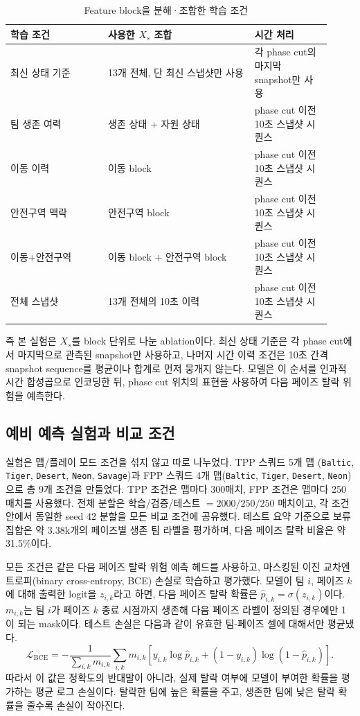\begin{table}[t]
\centering
\caption{Feature block을 분해·조합한 학습 조건}
\label{tab:feature-condition-map}
\small
\setlength{\tabcolsep}{4pt}
\begin{tabular}{L{0.28\linewidth}L{0.42\linewidth}L{0.22\linewidth}}
\toprule
학습 조건 & 사용한 \(X_s\) 조합 & 시간 처리 \\
\midrule
최신 상태 기준
& 13개 전체, 단 최신 스냅샷만 사용
& 각 phase cut의 마지막 snapshot만 사용 \\
팀 생존 여력
& 생존 상태 + 자원 상태
& phase cut 이전 10초 스냅샷 시퀀스 \\
이동 이력
& 이동 block
& phase cut 이전 10초 스냅샷 시퀀스 \\
안전구역 맥락
& 안전구역 block
& phase cut 이전 10초 스냅샷 시퀀스 \\
이동+안전구역
& 이동 block + 안전구역 block
& phase cut 이전 10초 스냅샷 시퀀스 \\
전체 스냅샷
& 13개 전체의 10초 이력
& phase cut 이전 10초 스냅샷 시퀀스 \\
\bottomrule
\end{tabular}
\end{table}

즉 본 실험은 \(X_s\)를 block 단위로 나눈 ablation이다. 최신 상태 기준은 각 phase
cut에서 마지막으로 관측된 snapshot만 사용하고, 나머지 시간 이력 조건은 10초 간격
snapshot sequence를 평균이나 합계로 먼저 뭉개지 않는다. 모델은 이 순서를 인과적
시간 합성곱으로 인코딩한 뒤, phase cut 위치의 표현을 사용하여 다음 페이즈 탈락
위험을 예측한다.

\subsection{예비 예측 실험과 비교 조건}

실험은 맵/플레이 모드 조건을 섞지 않고 따로 나누었다. TPP 스쿼드 5개 맵
(\texttt{Baltic}, \texttt{Tiger}, \texttt{Desert}, \texttt{Neon}, \texttt{Savage})과
FPP 스쿼드 4개 맵(\texttt{Baltic}, \texttt{Tiger}, \texttt{Desert}, \texttt{Neon})으로
총 9개 조건을 만들었다. TPP 조건은 맵마다 300매치, FPP 조건은 맵마다 250매치를
사용했다. 전체 분할은 학습/검증/테스트 \(=2000/250/250\) 매치이고, 각 조건 안에서
동일한 seed 42 분할을 모든 비교 조건에 공유했다. 테스트 요약
기준으로 보류 집합은 약 3.38k개의 페이즈별 생존 팀 라벨을 평가하며, 다음 페이즈
탈락 비율은 약 31.5\%이다.

모든 조건은 같은 다음 페이즈 탈락 위험 예측 헤드를 사용하고, 마스킹된 이진
교차엔트로피(binary cross-entropy, BCE) 손실로 학습하고 평가했다. 모델이 팀
\(i\), 페이즈 \(k\)에 대해 출력한 logit을 \(z_{i,k}\)라고 하면, 다음 페이즈 탈락
확률은 \(\hat{p}_{i,k}=\sigma(z_{i,k})\)이다. \(m_{i,k}\)는 팀 \(i\)가 페이즈 \(k\)
종료 시점까지 생존해 다음 페이즈 라벨이 정의된 경우에만 1이 되는 mask이다. 테스트
손실은 다음과 같이 유효한 팀-페이즈 셀에 대해서만 평균냈다.
\[
\mathcal{L}_{\mathrm{BCE}}
=
-\frac{1}{\sum_{i,k} m_{i,k}}
\sum_{i,k} m_{i,k}
\left[
y_{i,k}\log \hat{p}_{i,k}
+(1-y_{i,k})\log (1-\hat{p}_{i,k})
\right].
\]
따라서 이 값은 정확도의 반대말이 아니라, 실제 탈락 여부에 모델이 부여한 확률을
평가하는 평균 로그 손실이다. 탈락한 팀에 높은 확률을 주고, 생존한 팀에 낮은 탈락
확률을 줄수록 손실이 작아진다.

